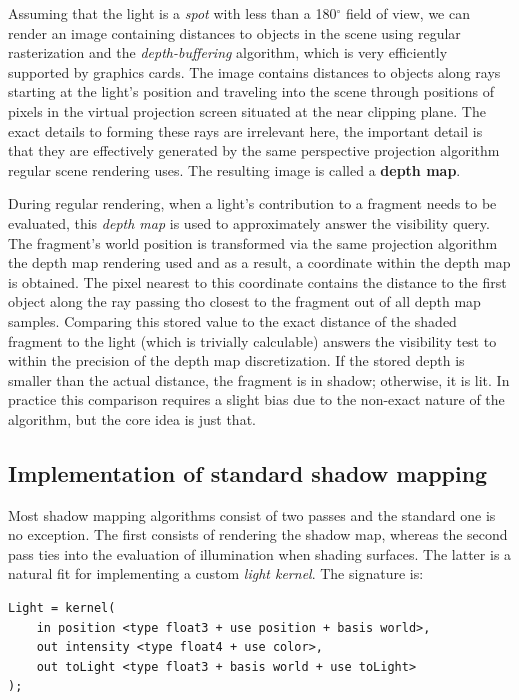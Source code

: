 Assuming that the light is a \emph{spot} with less than a 180$^\circ$ field of view, we can render an image containing distances to objects in the scene using regular rasterization and the \emph{depth-buffering} algorithm, which is very efficiently supported by graphics cards. The image contains distances to objects along rays starting at the light's position and traveling into the scene through positions of pixels in the virtual projection screen situated at the near clipping plane. The exact details to forming these rays are irrelevant here, the important detail is that they are effectively generated by the same perspective projection algorithm regular scene rendering uses. The resulting image is called a \textbf{depth map}.

During regular rendering, when a light's contribution to a fragment needs to be evaluated, this \emph{depth map} is used to approximately answer the visibility query. The fragment's world position is transformed via the same projection algorithm the depth map rendering used and as a result, a coordinate within the depth map is obtained. The pixel nearest to this coordinate contains the distance to the first object along the ray passing tho closest to the fragment out of all depth map samples. Comparing this stored value to the exact distance of the shaded fragment to the light (which is trivially calculable) answers the visibility test to within the precision of the depth map discretization. If the stored depth is smaller than the actual distance, the fragment is in shadow; otherwise, it is lit. In practice this comparison requires a slight bias due to the non-exact nature of the algorithm, but the core idea is just that.

\subsection{Implementation of standard shadow mapping}

Most shadow mapping algorithms consist of two passes and the standard one is no exception. The first consists of rendering the shadow map, whereas the second pass ties into the evaluation of illumination when shading surfaces. The latter is a natural fit for implementing a custom \emph{light kernel}. The signature is:
	
\noindent\begin{minipage}{\textwidth}
\begin{lstlisting}[frame=single]
Light = kernel(
    in position <type float3 + use position + basis world>,
    out intensity <type float4 + use color>,
    out toLight <type float3 + basis world + use toLight>
);
\end{lstlisting}
\end{minipage}

